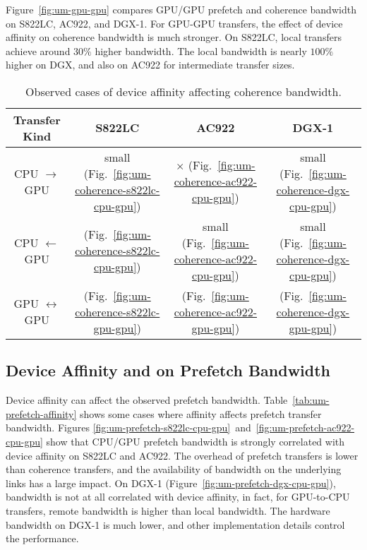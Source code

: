 Figure~\ref{fig:um-gpu-gpu} compares GPU/GPU prefetch and coherence bandwidth on S822LC, AC922, and DGX-1.
For GPU-GPU transfers, the effect of device affinity on coherence bandwidth is much stronger.
On S822LC, local transfers achieve around $30\%$ higher bandwidth.
The local bandwidth is nearly $100\%$ higher on DGX, and also on AC922 for intermediate transfer sizes.

\begin{table}[ht]
	\centering
	\caption[Device Affinity and Coherence Bandwidth]{
		Observed cases of device affinity affecting coherence bandwidth.
	}
	\label{tab:um-coherence-affinity}
	\begin{tabular}{cccc}
		\hline
		\textbf{Transfer Kind}    & \textbf{S822LC}                                         & \textbf{AC922}                                         & \textbf{DGX-1}                                      \\ \hline 
		CPU $\rightarrow$     GPU & small (Fig.~\ref{fig:um-coherence-s822lc-cpu-gpu})      & $\times$   (Fig.~\ref{fig:um-coherence-ac922-cpu-gpu}) & small (Fig.~\ref{fig:um-coherence-dgx-cpu-gpu}) \\ \hline
		CPU $\leftarrow$      GPU & \checkmark (Fig.~\ref{fig:um-coherence-s822lc-cpu-gpu}) & small (Fig.~\ref{fig:um-coherence-ac922-cpu-gpu})      & small (Fig.~\ref{fig:um-coherence-dgx-cpu-gpu}) \\ \hline
		GPU $\leftrightarrow$ GPU & \checkmark (Fig.~\ref{fig:um-coherence-s822lc-gpu-gpu}) & \checkmark (Fig.~\ref{fig:um-coherence-ac922-gpu-gpu}) & \checkmark (Fig.~\ref{fig:um-coherence-dgx-gpu-gpu}) \\ \hline
	\end{tabular}
\end{table}


\subsection{Device Affinity and on Prefetch Bandwidth}

Device affinity can affect the observed prefetch bandwidth.
Table~\ref{tab:um-prefetch-affinity} shows some cases where affinity affects prefetch transfer bandwidth.
Figures \ref{fig:um-prefetch-s822lc-cpu-gpu}~and~\ref{fig:um-prefetch-ac922-cpu-gpu} show that CPU/GPU prefetch bandwidth is strongly correlated with device affinity on S822LC and AC922.
The overhead of prefetch transfers is lower than coherence transfers, and the availability of bandwidth on the underlying links has a large impact.
On DGX-1 (Figure~\ref{fig:um-prefetch-dgx-cpu-gpu}), bandwidth is not at all correlated with device affinity, in fact, for GPU-to-CPU transfers, remote bandwidth is higher than local bandwidth.
The hardware bandwidth on DGX-1 is much lower, and other implementation details control the performance.

